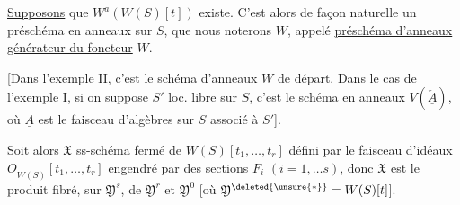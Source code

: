 \uline{Supposons} que $W^a(W(S)[t])$ existe. C'est alors de façon naturelle un préschéma en anneaux sur $S$, que nous noterons $W$, appelé \uline{préschéma d'anneaux générateur du foncteur} $W$.

[Dans l'exemple II, c'est le schéma d'anneaux $W$ de départ. Dans le cas de l'exemple I,  si  on suppose $S'$  loc. libre sur $S$, c'est le  schéma en anneaux $V(\check{\underline A})$, où $\underline A$ est le faisceau d'algèbres sur $S$ associé à $S'$].

Soit alors $\mathfrak X$ ss-schéma fermé de $W(S)[t_1,\ldots,t_r]$ défini par  le faisceau d'idéaux  $\underline O_{W(S)}[t_1,\ldots,t_r]$ engendré par des sections $F_i$ $(i=1,\ldots s)$, donc $\mathfrak X$ est le produit fibré, sur $\mathfrak Y^s$, de $\mathfrak Y^r$ et $\mathfrak Y^0$ [où $\mathfrak Y^{\deleted{\unsure{*}}}=W(S)[t]$].

